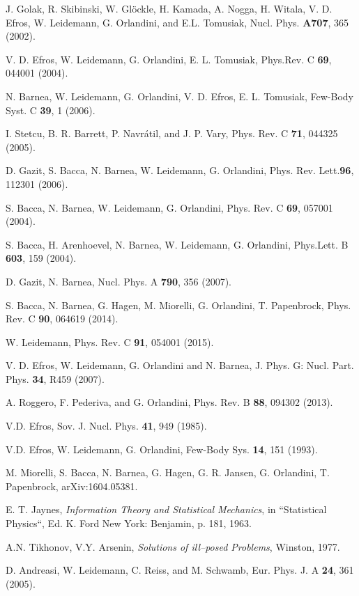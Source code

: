 \begin{thebibliography}{00}
 J. Golak, R. Skibinski, W. Gl\"ockle, H. Kamada, A. Nogga, 
H. Witala, V. D. Efros, W. Leidemann, G. Orlandini, and E.L. Tomusiak, 
Nucl. Phys. {\bf A707}, 365 (2002).
  
 V. D. Efros, W. Leidemann, G. Orlandini, E. L. Tomusiak,  Phys.Rev. C {\bf  69},  044001 (2004).

 N. Barnea, W. Leidemann, G. Orlandini, V. D. Efros, E. L. Tomusiak, Few-Body Syst. C {\bf 39}, 1 (2006).

 I. Stetcu, B. R. Barrett, P. Navr\'atil, and J. P. Vary, Phys. Rev. C \textbf{71}, 044325 (2005).

 D. Gazit, S. Bacca, N. Barnea, W. Leidemann, G. Orlandini, Phys. Rev. Lett.{\bf  96}, 112301 (2006). 

 S. Bacca, N. Barnea, W. Leidemann, G. Orlandini, Phys. Rev. C {\bf 69}, 057001 (2004).

 S. Bacca, H. Arenhoevel, N. Barnea, W. Leidemann, G. Orlandini,  Phys.Lett. B {\bf 603}, 159 (2004).

D. Gazit, N. Barnea, Nucl. Phys. A {\bf 790}, 356 (2007). 

 S. Bacca, N. Barnea, G. Hagen, M. Miorelli, G. Orlandini, T. Papenbrock, Phys. Rev. C {\bf 90}, 064619 (2014).

 W. Leidemann, Phys. Rev. C {\bf 91}, 054001 (2015). 

 V. D. Efros, W. Leidemann, G. Orlandini and N. Barnea,
J. Phys. G: Nucl. Part. Phys. {\bf 34}, R459 (2007).

 A. Roggero, F. Pederiva, and G. Orlandini, Phys. Rev. B {\bf 88}, 094302 (2013).

 V.D. Efros, Sov. J. Nucl. Phys. {\bf 41}, 949 (1985).

 V.D. Efros,  W. Leidemann, G. Orlandini, Few-Body Sys. {\bf 14}, 151 (1993).

 M. Miorelli, S. Bacca, N. Barnea, G. Hagen, G. R. Jansen, G. Orlandini, T. Papenbrock, arXiv:1604.05381.
 
  E. T. Jaynes, {\it Information Theory and Statistical Mechanics}, in “Statistical Physics“, Ed. K.
Ford New York: Benjamin, p. 181, 1963.

 A.N. Tikhonov, V.Y. Arsenin, {\it Solutions of ill--posed Problems}, Winston, 1977.

D. Andreasi, W. Leidemann, C. Reiss, and M. Schwamb, Eur. Phys. J. A {\bf 24}, 361 (2005).

\end{thebibliography}



